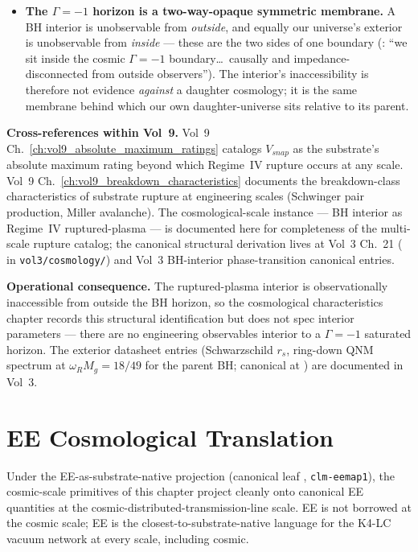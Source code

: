 \begin{itemize}
    \item \textbf{The $\Gamma=-1$\gammaundeclared{} horizon is a two-way-opaque symmetric membrane.} A BH interior is unobservable from \emph{outside}, and equally our universe's exterior is unobservable from \emph{inside} --- these are the two sides of one boundary (: ``we sit inside the cosmic $\Gamma=-1$ boundary\dots\ causally and impedance-disconnected from outside observers''). The interior's inaccessibility is therefore not evidence \emph{against} a daughter cosmology; it is the same membrane behind which our own daughter-universe sits relative to its parent.
\end{itemize}

\textbf{Cross-references within Vol~9.} Vol~9 Ch.~\ref{ch:vol9_absolute_maximum_ratings} catalogs $V_{snap}$ as the substrate's absolute maximum rating beyond which Regime~IV rupture occurs at any scale. Vol~9 Ch.~\ref{ch:vol9_breakdown_characteristics} documents the breakdown-class characteristics of substrate rupture at engineering scales (Schwinger pair production, Miller avalanche). The cosmological-scale instance --- BH interior as Regime~IV ruptured-plasma --- is documented here for completeness of the multi-scale rupture catalog; the canonical structural derivation lives at Vol~3 Ch.~21 ( in \texttt{vol3/cosmology/}) and Vol~3 BH-interior phase-transition canonical entries.

\textbf{Operational consequence.} The ruptured-plasma interior is observationally inaccessible from outside the BH horizon, so the cosmological characteristics chapter records this structural identification but does not spec interior parameters --- there are no engineering observables interior to a $\Gamma = -1$\gammaundeclared{} saturated horizon. The exterior datasheet entries (Schwarzschild $r_s$, ring-down QNM spectrum at $\omega_R M_g = 18/49$ for the parent BH; canonical at ) are documented in Vol~3.

\section{EE Cosmological Translation}
\label{sec:vol9_cosmo_ee_translation}

Under the EE-as-substrate-native projection (canonical leaf , \texttt{clm-eemap1}), the cosmic-scale primitives of this chapter project cleanly onto canonical EE quantities at the cosmic-distributed-transmission-line scale. EE is not borrowed at the cosmic scale; EE is the closest-to-substrate-native language for the K4-LC vacuum network at every scale, including cosmic.

